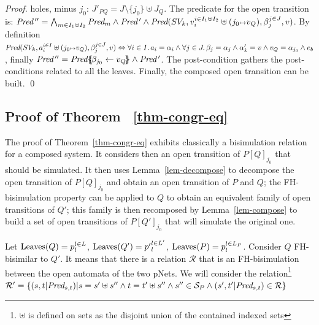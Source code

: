 \documentclass{lncs/llncs}
\begin{document}
\begin{small}
\begin{proof}
holes, minus $j_0$: $J'_{PQ}=  J\setminus\{j_0\}\uplus J_Q$. The 
predicate for the open 
transition is: $\Pred\,''=\bigwedge_{m\in I _1\uplus I_2}\Pred_m \land \Pred\,'
\land \Pred(SV_k,v_i^{i\in I_1\uplus I_2}\uplus(j_0\mapsto v_Q),\beta_j^{j\in J},v)$. By 
definition 
$\Pred(SV_k,a_i^{i\in I}\uplus(j_0\mapsto v_Q),\beta_j^{j\in J},v)\Leftrightarrow
	\forall i\in I.\, a_i=\alpha_i\land \forall j \in J.\, \beta_j=\alpha_j \land 
	\alpha'_k=v\land v_Q=\alpha_{j_0}\land e_b$, finally 
	$\Pred\,''=\Pred\subst{\beta_{j_0}\leftarrow 
	v_Q} \land \Pred\,'$. The post-condition gathers the post-conditions related to all 
	the leaves. Finally, the composed open transition can be
        built. \qed
        \end{proof}
\end{small}


 \subsection{Proof of Theorem ~\ref{thm-congr-eq}}
 The proof of Theorem~\ref{thm-congr-eq} exhibits classically a bisimulation relation for 
 a 
 composed system.  It considers then an open transition of $P[Q]_{j_0}$ that should be 
 simulated. It then uses  Lemma~\ref{lem-decompose} to decompose the open transition 
 of $P[Q]_{j_0}$ and obtain an open transition of $P$ and $Q$; the FH-bisimulation 
 property can 
 be applied  to $Q$ to obtain an equivalent family of open transitions of $Q'$; this 
 family is 
 then recomposed by Lemma~\ref{lem-compose} to build a set of open transitions of 
 $P[Q']_{j_0}$ 
 that will simulate the original one.
 

 Let $\operatorname{Leaves}(Q)=p_l^{l\in L}$, $\operatorname{Leaves}(Q')={p'}_l^{l\in L'}$, 
 $\operatorname{Leaves}(P)=p_l^{l\in L_P}$.
 Consider $Q$ FH-bisimilar to $Q'$. It means that there is a relation 
 $\mathcal{R}$ that is an FH-bisimulation between the open automata of the two pNets. 
 We will consider the relation\footnote{$\uplus$ is defined on sets as the disjoint union 
 of the contained indexed 
 sets} $\mathcal{R}'=\{(s,t|\Pred_{s,t})|s=s'\uplus s'' \land 
 t=t'\uplus s'' \land s''\in \mathcal{S}_P \land (s',t'|\Pred_{s,t})\in\mathcal{R}\}$ 
  
\end{document}
